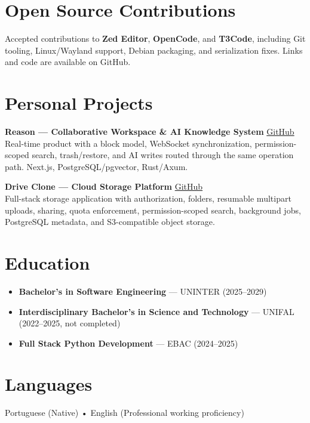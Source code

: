 \documentclass[a4paper,10pt]{article}
\begin{document}
\vspace{-4pt}
\section*{Open Source Contributions}
Accepted contributions to \textbf{Zed Editor}, \textbf{OpenCode}, and \textbf{T3Code}, including Git tooling, Linux/Wayland support, Debian packaging, and serialization fixes. Links and code are available on GitHub.

\vspace{-4pt}
\section*{Personal Projects}

\textbf{Reason — Collaborative Workspace \& AI Knowledge System} \hfill \href{https://github.com/IsraelAraujo70/notion-clone}{GitHub}\\
Real-time product with a block model, WebSocket synchronization, permission-scoped search, trash/restore, and AI writes routed through the same operation path. Next.js, PostgreSQL/pgvector, Rust/Axum.

\vspace{4pt}
\textbf{Drive Clone — Cloud Storage Platform} \hfill \href{https://github.com/IsraelAraujo70/drive-clone}{GitHub}\\
Full-stack storage application with authorization, folders, resumable multipart uploads, sharing, quota enforcement, permission-scoped search, background jobs, PostgreSQL metadata, and S3-compatible object storage.

\section*{Education}
\begin{itemize}[leftmargin=*, itemsep=2pt]
    \item \textbf{Bachelor's in Software Engineering} — UNINTER (2025--2029)
    \item \textbf{Interdisciplinary Bachelor's in Science and Technology} — UNIFAL (2022--2025, not completed)
    \item \textbf{Full Stack Python Development} — EBAC (2024--2025)
\end{itemize}

\section*{Languages}
Portuguese (Native) • English (Professional working proficiency)
\end{document}
